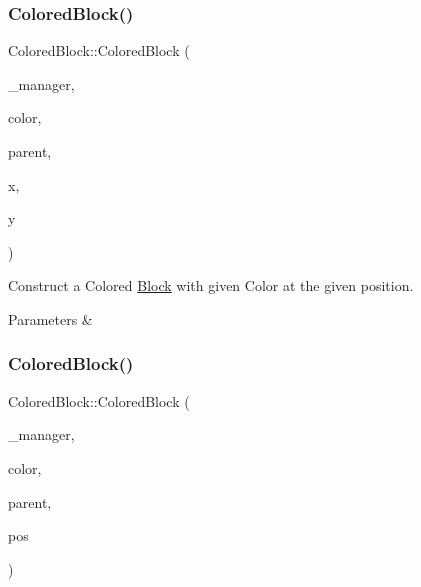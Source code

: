 \subsubsection{\texorpdfstring{ColoredBlock()}{ColoredBlock()}\hspace{0.1cm}{\footnotesize\ttfamily [2/3]}}
{\footnotesize\ttfamily Colored\+Block\+::\+Colored\+Block (\begin{DoxyParamCaption}\item[{\mbox{\hyperlink{class_game_manager}{Game\+Manager}} $\ast$}]{\+\_\+manager,  }\item[{\mbox{\hyperlink{classsf_1_1_color}{sf\+::\+Color}}}]{color,  }\item[{\mbox{\hyperlink{class_game_entity}{Game\+Entity}} $\ast$}]{parent,  }\item[{float}]{x,  }\item[{float}]{y }\end{DoxyParamCaption})\hspace{0.3cm}{\ttfamily [inline]}}



Construct a Colored \mbox{\hyperlink{class_block}{Block}} with given Color at the given position. 


\begin{DoxyParams}{Parameters}
{\em } & \\
\hline
\end{DoxyParams}
\mbox{\label{class_colored_block_a52df8c86d732fbadf3d913227dfd011b}} 
\subsubsection{\texorpdfstring{ColoredBlock()}{ColoredBlock()}\hspace{0.1cm}{\footnotesize\ttfamily [3/3]}}
{\footnotesize\ttfamily Colored\+Block\+::\+Colored\+Block (\begin{DoxyParamCaption}\item[{\mbox{\hyperlink{class_game_manager}{Game\+Manager}} $\ast$}]{\+\_\+manager,  }\item[{\mbox{\hyperlink{classsf_1_1_color}{sf\+::\+Color}}}]{color,  }\item[{\mbox{\hyperlink{class_game_entity}{Game\+Entity}} $\ast$}]{parent,  }\item[{\mbox{\hyperlink{classsf_1_1_vector2}{sf\+::\+Vector2f}}}]{pos }\end{DoxyParamCaption})\hspace{0.3cm}{\ttfamily [inline]}}



